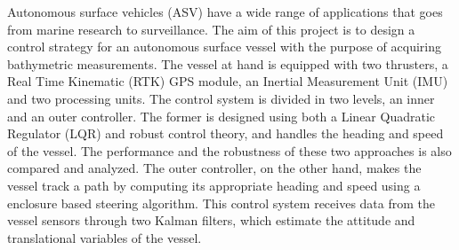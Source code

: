 Autonomous surface vehicles (ASV) have a wide range of applications that goes from marine research to surveillance. The aim of this project is to design a control strategy for an autonomous surface vessel with the purpose of acquiring bathymetric measurements. The vessel at hand is equipped with two thrusters, a Real Time Kinematic (RTK) GPS module, an Inertial Measurement Unit (IMU) and two processing units. The control system is divided in two levels, an inner and an outer controller. The former is designed using both a Linear Quadratic Regulator (LQR) and robust control theory, and handles the heading and speed of the vessel. The performance and the robustness of these two approaches is also compared and analyzed. The outer controller, on the other hand, makes the vessel track a path by computing its appropriate heading and speed using a enclosure based steering algorithm. This control system receives data from the vessel sensors through two Kalman filters, which estimate the attitude and translational variables of the vessel.